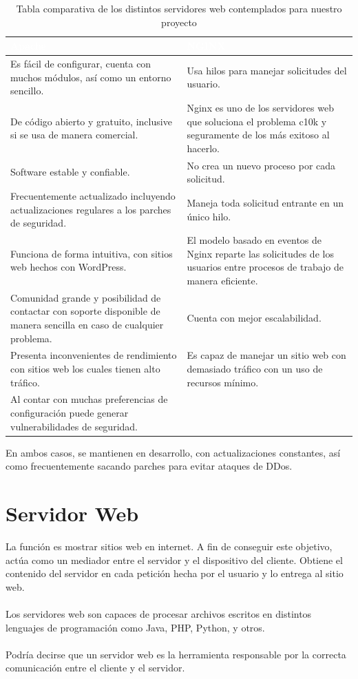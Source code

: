 \documentclass[12pt, a4paper, titlepage]{report}
\begin{document}
		\begin{table}[hbt!]
			\begin{tabular}{|m{7.5cm}|m{7.5cm}|}
				\hline    		
				\rowcolor{guindapoli}
				{\textbf{\textcolor{white}{Apache}}} & {\textbf{\textcolor{white}{NGINX}}}\\
				\hline
				Es fácil de configurar, cuenta con muchos módulos, así como un entorno sencillo. &  Usa hilos para manejar solicitudes del usuario.\\
				\hline
				De código abierto y gratuito, inclusive si se usa de manera comercial. & Nginx es uno de los servidores web que soluciona el problema c10k y seguramente de los más exitoso al hacerlo.\\
				\hline
				Software estable y confiable. & No crea un nuevo proceso por cada solicitud.\\
				\hline
				Frecuentemente actualizado incluyendo actualizaciones regulares a los parches de seguridad. & Maneja toda solicitud entrante en un único hilo.\\
				\hline
				Funciona de forma intuitiva, con sitios web hechos con WordPress.  & El modelo basado en eventos de Nginx reparte las solicitudes de los usuarios entre procesos de trabajo de manera eficiente.\\
				\hline
				Comunidad grande y posibilidad de contactar con soporte disponible de manera sencilla en caso de cualquier problema. &  Cuenta con mejor escalabilidad.\\
				\hline
				Presenta inconvenientes de rendimiento con sitios web los cuales tienen alto tráfico. & Es capaz de manejar un sitio web con demasiado tráfico con un uso de recursos mínimo.\\
				\hline
				Al contar con muchas preferencias de configuración puede generar vulnerabilidades de seguridad. & \\
				\hline	
			\end{tabular}
			\caption[Comparación de servidores web]{Tabla comparativa de los distintos servidores web contemplados para nuestro proyecto}
		\end{table}
		En ambos casos, se mantienen en desarrollo, con actualizaciones constantes, así como frecuentemente sacando parches para evitar ataques de DDos.
	    \section{Servidor Web}
	        La función es mostrar sitios web en internet. A fin de conseguir este objetivo, actúa como un mediador entre el servidor y el dispositivo del cliente. Obtiene el contenido del servidor en cada petición hecha por el usuario y lo entrega al sitio web.\\\\
	        Los servidores web son capaces de procesar archivos escritos en distintos lenguajes de programación como Java, PHP, Python, y otros.\\\\
	        Podría decirse que un servidor web es la herramienta responsable por la correcta comunicación entre el cliente y el servidor.
\end{document}
